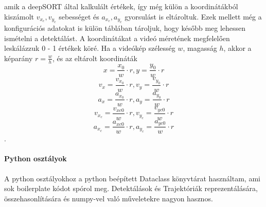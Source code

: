 \documentclass[12pt,a4paper]{article}
\begin{document}
amik a deepSORT által kalkulált értékek, így még külön a koordinátákból kiszámolt \begin{math}v_{x_c},v_{y_c}\end{math} sebességet és
\begin{math}a_{x_c},a_{y_c}\end{math} gyorsulást is eltároltuk.
Ezek mellett még a konfigurációs adatokat is külön táblában tároljuk, hogy később meg lehessen ismételni a detektálást.
A koordinátákat a videó méretének megfelelően leskálázzuk 0 - 1 értékek köré. Ha a videókép szélesség \begin{math}w\end{math}, magasság \begin{math}h\end{math},
akkor a képarány \begin{math}r = \frac{w}{h}\end{math}, és az eltárolt koordináták
\newpage
\begin{equation}x = \frac{x_0}{w} \cdot r, y = \frac{y_0}{w} \cdot r\end{equation}
\begin{equation}v_x = \frac{v_{x_0}}{w} \cdot r, v_y = \frac{v_{y_0}}{w} \cdot r\end{equation}
\begin{equation}a_x = \frac{a_{x_0}}{w} \cdot r, a_y = \frac{a_{y_0}}{w} \cdot r\end{equation}
\begin{equation}v_{x_c} = \frac{v_{xc0}}{w} \cdot r, v_{y_c} = \frac{v_{yc0}}{w} \cdot r\end{equation}
\begin{equation}a_{x_c} = \frac{a_{xc0}}{w} \cdot r, a_{y_c} = \frac{a_{yc0}}{w} \cdot r\end{equation}.

\paragraph{Python osztályok} A python osztályokhoz a python beépített Dataclass könyvtárat használtam, ami sok boilerplate kódot spórol meg.
Detektálások és Trajektóriák reprezentálására, összehasonlítására és numpy-vel való műveletekre nagyon hasznos.
\end{document}
